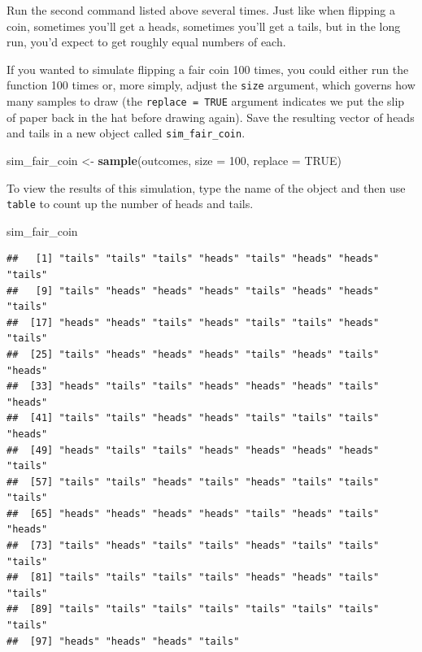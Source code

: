 \documentclass[]{article}
\newenvironment{Shaded}{\begin{snugshade}}{\end{snugshade}}
\newcommand{\KeywordTok}[1]{\textcolor[rgb]{0.13,0.29,0.53}{\textbf{{#1}}}}
\newcommand{\DataTypeTok}[1]{\textcolor[rgb]{0.13,0.29,0.53}{{#1}}}
\newcommand{\DecValTok}[1]{\textcolor[rgb]{0.00,0.00,0.81}{{#1}}}
\newcommand{\StringTok}[1]{\textcolor[rgb]{0.31,0.60,0.02}{{#1}}}
\newcommand{\OtherTok}[1]{\textcolor[rgb]{0.56,0.35,0.01}{{#1}}}
\newcommand{\NormalTok}[1]{{#1}}
\begin{document}
Run the second command listed above several times. Just like when
flipping a coin, sometimes you'll get a heads, sometimes you'll get a
tails, but in the long run, you'd expect to get roughly equal numbers of
each.

If you wanted to simulate flipping a fair coin 100 times, you could
either run the function 100 times or, more simply, adjust the
\texttt{size} argument, which governs how many samples to draw (the
\texttt{replace\ =\ TRUE} argument indicates we put the slip of paper
back in the hat before drawing again). Save the resulting vector of
heads and tails in a new object called \texttt{sim\_fair\_coin}.

\begin{Shaded}
\begin{Highlighting}[]
\NormalTok{sim_fair_coin <-}\StringTok{ }\KeywordTok{sample}\NormalTok{(outcomes, }\DataTypeTok{size =} \DecValTok{100}\NormalTok{, }\DataTypeTok{replace =} \OtherTok{TRUE}\NormalTok{)}
\end{Highlighting}
\end{Shaded}

To view the results of this simulation, type the name of the object and
then use \texttt{table} to count up the number of heads and tails.

\begin{Shaded}
\begin{Highlighting}[]
\NormalTok{sim_fair_coin}
\end{Highlighting}
\end{Shaded}

\begin{verbatim}
##   [1] "tails" "tails" "tails" "heads" "tails" "heads" "heads" "tails"
##   [9] "tails" "heads" "heads" "heads" "tails" "heads" "heads" "tails"
##  [17] "heads" "heads" "tails" "heads" "tails" "tails" "heads" "tails"
##  [25] "tails" "heads" "heads" "heads" "tails" "heads" "tails" "heads"
##  [33] "heads" "tails" "tails" "heads" "heads" "heads" "tails" "heads"
##  [41] "tails" "tails" "heads" "heads" "tails" "tails" "tails" "heads"
##  [49] "heads" "tails" "tails" "heads" "heads" "heads" "heads" "tails"
##  [57] "tails" "tails" "heads" "tails" "heads" "tails" "tails" "tails"
##  [65] "heads" "heads" "heads" "heads" "tails" "heads" "tails" "heads"
##  [73] "tails" "heads" "tails" "tails" "heads" "tails" "tails" "tails"
##  [81] "tails" "tails" "tails" "tails" "heads" "heads" "tails" "tails"
##  [89] "tails" "tails" "tails" "tails" "tails" "tails" "tails" "tails"
##  [97] "heads" "heads" "heads" "tails"
\end{verbatim}
\end{document}
